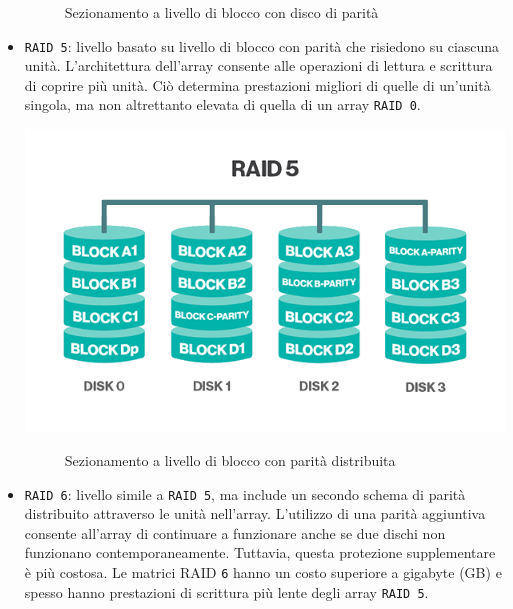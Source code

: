 \begin{itemize}
\begin{figure}[htbp]
\caption{Sezionamento a livello di blocco con disco di parit\`{a}\label{figura1.8} \cite{etichetta9}}
\end{figure}

\item
\verb"RAID 5": livello basato su livello di blocco con parit\`{a} che risiedono su ciascuna unit\`{a}. L'architettura dell'array consente alle operazioni di lettura e scrittura di coprire pi\`{u} unit\`{a}. Ci\`{o} determina prestazioni migliori di quelle di un'unit\`{a} singola, ma non altrettanto elevata di quella di un array \verb"RAID 0".\cite{etichetta9}\\

\begin{center}
\includegraphics[scale=0.50]{img/raid55.png}
\end{center}

\begin{figure}[htbp]
\caption{Sezionamento a livello di blocco con parit\`{a} distribuita\label{figura1.9} \cite{etichetta9}}
\end{figure}

\item
\verb"RAID 6": livello simile a \verb"RAID 5", ma include un secondo schema di parit\`{a} distribuito attraverso le unit\`{a} nell'array. L'utilizzo di una parit\`{a} aggiuntiva consente all'array di continuare a funzionare anche se due dischi non funzionano contemporaneamente. Tuttavia, questa protezione supplementare \`{e} pi\`{u} costosa. Le matrici RAID \verb"6" hanno un costo superiore a gigabyte (GB) e spesso hanno prestazioni di scrittura pi\`{u} lente degli array \verb"RAID 5".\cite{etichetta9}\\


\end{itemize}
